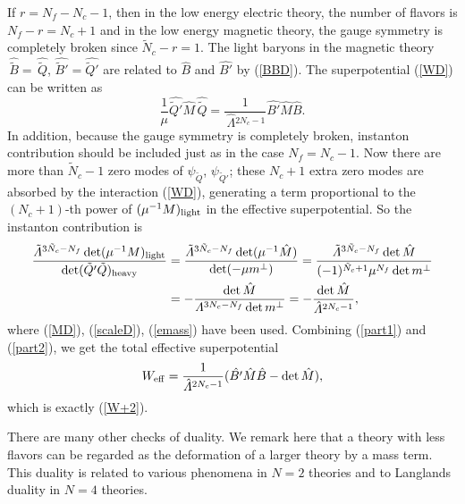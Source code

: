 \documentclass[lecture]{qft-l}
\newcommand{\Lam}{\varLambda}
\newcommand{\inv}[1]{\frac{1}{#1}}
\newcommand{\eff}{_{{\rm eff}}}
\newcommand{\BT}{B'}%
\newcommand{\ND}{\tilde{N}_c}
\newcommand{\QD}{\tilde{Q}}
\newcommand{\BD}{\tilde{B}}
\newcommand{\QDT}{\tilde{Q}'}
\newcommand{\BDT}{\tilde{B}'}
\newcommand{\QDh}{\,\hat{\!\QD}}
\newcommand{\QDTh}{\hat{\QDT}}
\newcommand{\BDh}{\,\hat{\!\BD}}
\newcommand{\BDTh}{\hat{\BDT}}
\newcommand{\Lamh}{\,\hat{\!\Lam}{}}
\newcommand{\LamD}{\,\tilde{\!\Lam}{}}
\numberwithin{figure}{chapter}
\begin{document}
If $r=N_f-N_c-1$, then in the low energy electric theory, the number of 
flavors is $N_f-r=N_c+1$ and in the low energy magnetic theory,
the gauge symmetry is completely broken since $\ND-r=1$.
The light baryons in the magnetic theory $\BDh=\QDh$,
$\BDTh=\QDTh$ are related to $\hat{B}$ and $\hat{\BT}$ by (\ref{BBD}).
The superpotential (\ref{WD}) can be written as 
\begin{equation}\label{part1}
\inv{\mu}\QDTh\hat{M}\QDh
=\inv{\Lamh^{2N_c-1}}\hat{\BT}\hat{M}\hat{B}.
\end{equation}
In addition, because the gauge symmetry is completely broken,
instanton contribution should be included just as in 
the case $N_f=N_c-1$.
Now there are more than $\ND-1$ zero modes of $\psi_{\QD}$, $\psi_{\QDT}$;
these $N_c+1$ extra zero modes are 
absorbed by the interaction (\ref{WD}),
generating a term proportional to the $(N_c+1)$-th power of 
$(\mu^{-1}M)_{\rm light}$ in the effective superpotential.
So the instanton contribution is
\begin{equation}
\begin{aligned}\label{part2}
\frac{\LamD^{3\ND-N_f}
\det(\mu^{-1}M)_{\rm light}}{\det(\QDT\QD)_{\rm heavy}}
&=\frac{\LamD^{3\ND-N_f}\det(\mu^{-1}\hat{M})}{\det(-\mu m^\perp)}
=\frac{\LamD^{3\ND-N_f}
\det\hat{M}}{(-1)^{\ND+1}\mu^{N_f}\det m^\perp}\\
&=-\frac{\det\hat{M}}{\Lam^{3N_c-N_f}\det m^\perp}
=-\frac{\det\hat{M}}{\Lamh^{2N_c-1}},
\end{aligned}
\end{equation}
where (\ref{MD}), (\ref{scaleD}), (\ref{emass}) have been used.
Combining (\ref{part1}) and (\ref{part2}), 
we get the total effective superpotential
\begin{equation}
W\eff=\inv{\Lamh^{2N_c-1}}(\hat{\BT}\hat{M}\hat{B}-\det\hat{M}),
\end{equation}
which is exactly (\ref{W+2}).

There are many other checks of duality.
We remark here that a theory with less flavors can be regarded as the
deformation of a larger theory by a mass term.
This duality is related to various phenomena in $N=2$ theories and to
Langlands duality in $N=4$ theories.

	
\end{document}
